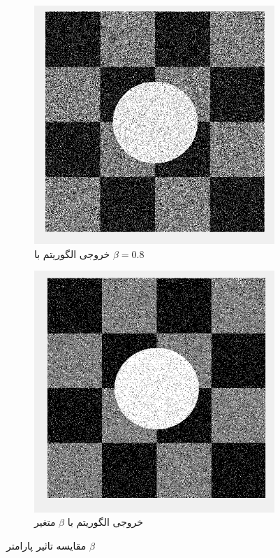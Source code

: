 \documentclass[11.5pt,a4paper]{article}
\begin{document}
\begin{figure}[h]
\begin{subfigure}{0.3\textwidth}
	\includegraphics[scale=0.3]{Imgs/MRF_S1_Beta8_Res.png}
	\caption{خروجی الگوریتم با $\beta=0.8$}
	\end{subfigure}
	\begin{subfigure}{0.3\textwidth}
	\includegraphics[scale=0.3]{Imgs/MRF_S1_BetaV_Res.png}
	\caption{خروجی الگوریتم با $\beta$ متغیر}
	\end{subfigure}
	
\caption{مقایسه تاثیر پارامتر  $\beta$}
\label{fig:Beta}
\end{figure}
\end{document}
